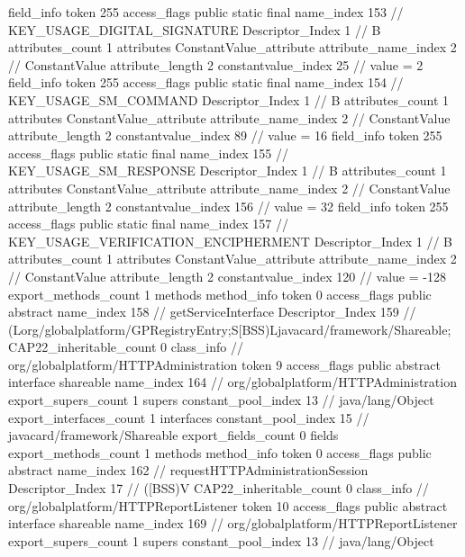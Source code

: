 {{{{{{{				}
				}
			}
			field_info {
				token	255
				access_flags	public static final
				name_index	153		// KEY_USAGE_DIGITAL_SIGNATURE
				Descriptor_Index	1		// B
				attributes_count	1
				attributes {
				ConstantValue_attribute {
					attribute_name_index	2		// ConstantValue
					attribute_length	2
					constantvalue_index	25		// value = 2
				}
				}
			}
			field_info {
				token	255
				access_flags	public static final
				name_index	154		// KEY_USAGE_SM_COMMAND
				Descriptor_Index	1		// B
				attributes_count	1
				attributes {
				ConstantValue_attribute {
					attribute_name_index	2		// ConstantValue
					attribute_length	2
					constantvalue_index	89		// value = 16
				}
				}
			}
			field_info {
				token	255
				access_flags	public static final
				name_index	155		// KEY_USAGE_SM_RESPONSE
				Descriptor_Index	1		// B
				attributes_count	1
				attributes {
				ConstantValue_attribute {
					attribute_name_index	2		// ConstantValue
					attribute_length	2
					constantvalue_index	156		// value = 32
				}
				}
			}
			field_info {
				token	255
				access_flags	public static final
				name_index	157		// KEY_USAGE_VERIFICATION_ENCIPHERMENT
				Descriptor_Index	1		// B
				attributes_count	1
				attributes {
				ConstantValue_attribute {
					attribute_name_index	2		// ConstantValue
					attribute_length	2
					constantvalue_index	120		// value = -128
				}
				}
			}
			}
			export_methods_count	1
			methods {
				method_info {
					token	0
					access_flags	public abstract
					name_index	158		// getServiceInterface
					Descriptor_Index	159		// (Lorg/globalplatform/GPRegistryEntry;S[BSS)Ljavacard/framework/Shareable;
				}
			}
			CAP22_inheritable_count	0
		}
		class_info {		// org/globalplatform/HTTPAdministration
			token	9
			access_flags	public abstract interface shareable
			name_index	164		// org/globalplatform/HTTPAdministration
			export_supers_count	1
			supers {
				constant_pool_index	13		// java/lang/Object
			}
			export_interfaces_count	1
			interfaces {
				constant_pool_index	15		// javacard/framework/Shareable
			}
			export_fields_count	0
			fields {
			}
			export_methods_count	1
			methods {
				method_info {
					token	0
					access_flags	public abstract
					name_index	162		// requestHTTPAdministrationSession
					Descriptor_Index	17		// ([BSS)V
				}
			}
			CAP22_inheritable_count	0
		}
		class_info {		// org/globalplatform/HTTPReportListener
			token	10
			access_flags	public abstract interface shareable
			name_index	169		// org/globalplatform/HTTPReportListener
			export_supers_count	1
			supers {
				constant_pool_index	13		// java/lang/Object
}}}}
